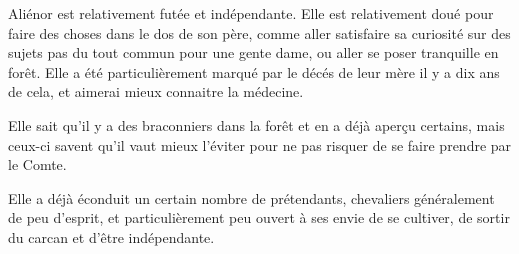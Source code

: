 Aliénor est relativement futée et indépendante. Elle est relativement doué pour faire des choses dans le dos de son père, comme aller satisfaire sa curiosité sur des sujets pas du tout commun pour une gente dame, ou aller se poser tranquille en forêt. Elle a été particulièrement marqué par le décés de leur mère il y a dix ans de cela, et aimerai mieux connaitre la médecine.

Elle sait qu'il y a des braconniers dans la forêt et en a déjà aperçu certains, mais ceux-ci savent qu'il vaut mieux l'éviter pour ne pas risquer de se faire prendre par le Comte.

Elle a déjà éconduit un certain nombre de prétendants, chevaliers généralement de peu d'esprit, et particulièrement peu ouvert à ses envie de se cultiver, de sortir du carcan et d'être indépendante.

